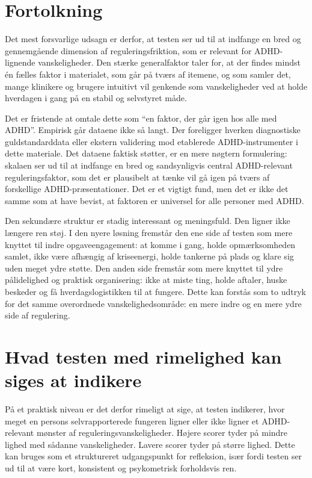 \documentclass[11pt,a4paper]{article}
\begin{document}
\section{Fortolkning}
Det mest forsvarlige udsagn er derfor, at testen ser ud til at indfange en bred og gennemgående dimension af reguleringsfriktion, som er relevant for ADHD-lignende vanskeligheder. Den stærke generalfaktor taler for, at der findes mindst én fælles faktor i materialet, som går på tværs af itemene, og som samler det, mange klinikere og brugere intuitivt vil genkende som vanskeligheder ved at holde hverdagen i gang på en stabil og selvstyret måde.

Det er fristende at omtale dette som ``en faktor, der går igen hos alle med ADHD''. Empirisk går dataene ikke så langt. Der foreligger hverken diagnostiske guldstandarddata eller ekstern validering mod etablerede ADHD-instrumenter i dette materiale. Det dataene faktisk støtter, er en mere nøgtern formulering: skalaen ser ud til at indfange en bred og sandsynligvis central ADHD-relevant reguleringsfaktor, som det er plausibelt at tænke vil gå igen på tværs af forskellige ADHD-præsentationer. Det er et vigtigt fund, men det er ikke det samme som at have bevist, at faktoren er universel for alle personer med ADHD.

Den sekundære struktur er stadig interessant og meningsfuld. Den ligner ikke længere ren støj. I den nyere løsning fremstår den ene side af testen som mere knyttet til indre opgaveengagement: at komme i gang, holde opmærksomheden samlet, ikke være afhængig af kriseenergi, holde tankerne på plads og klare sig uden meget ydre støtte. Den anden side fremstår som mere knyttet til ydre pålidelighed og praktisk organisering: ikke at miste ting, holde aftaler, huske beskeder og få hverdagslogistikken til at fungere. Dette kan forstås som to udtryk for det samme overordnede vanskelighedsområde: en mere indre og en mere ydre side af regulering.

\section{Hvad testen med rimelighed kan siges at indikere}
På et praktisk niveau er det derfor rimeligt at sige, at testen indikerer, hvor meget en persons selvrapporterede fungeren ligner eller ikke ligner et ADHD-relevant mønster af reguleringsvanskeligheder. Højere scorer tyder på mindre lighed med sådanne vanskeligheder. Lavere scorer tyder på større lighed. Dette kan bruges som et struktureret udgangspunkt for refleksion, især fordi testen ser ud til at være kort, konsistent og psykometrisk forholdsvis ren.
\end{document}
